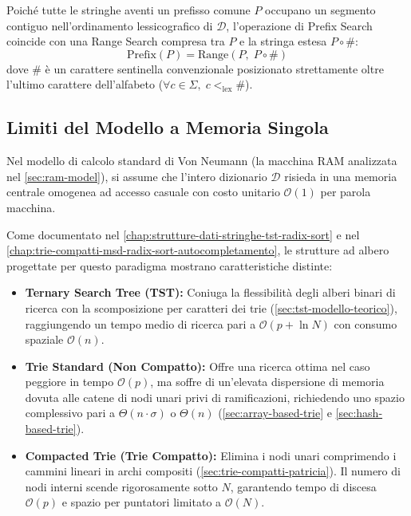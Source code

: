 \begin{property}
Poich\'e tutte le stringhe aventi un prefisso comune $P$ occupano un segmento contiguo nell'ordinamento lessicografico di $\mathcal{D}$, l'operazione di Prefix Search coincide con una Range Search compresa tra $P$ e la stringa estesa $P \circ \#$:
\begin{equation}
  \text{Prefix}(P) = \text{Range}(P, \; P \circ \#)
\end{equation}
dove $\#$ \`e un carattere sentinella convenzionale posizionato strettamente oltre l'ultimo carattere dell'alfabeto ($\forall c \in \Sigma, \; c <_{\text{lex}} \#$).
\end{property}

\FloatBarrier
\subsection{Limiti del Modello a Memoria Singola}
\label{subsec:limiti-1-memory-model}

Nel modello di calcolo standard di Von Neumann (la macchina RAM analizzata nel \autoref{sec:ram-model}), si assume che l'intero dizionario $\mathcal{D}$ risieda in una memoria centrale omogenea ad accesso casuale con costo unitario $\mathcal{O}(1)$ per parola macchina.

Come documentato nel \autoref{chap:strutture-dati-stringhe-tst-radix-sort} e nel \autoref{chap:trie-compatti-msd-radix-sort-autocompletamento}, le strutture ad albero progettate per questo paradigma mostrano caratteristiche distinte:
\begin{itemize}
  \item \textbf{Ternary Search Tree (TST):} Coniuga la flessibilit\`a degli alberi binari di ricerca con la scomposizione per caratteri dei trie (\autoref{sec:tst-modello-teorico}), raggiungendo un tempo medio di ricerca pari a $\mathcal{O}(p + \ln N)$ con consumo spaziale $\mathcal{O}(n)$.
  \item \textbf{Trie Standard (Non Compatto):} Offre una ricerca ottima nel caso peggiore in tempo $\mathcal{O}(p)$, ma soffre di un'elevata dispersione di memoria dovuta alle catene di nodi unari privi di ramificazioni, richiedendo uno spazio complessivo pari a $\Theta(n \cdot \sigma)$ o $\Theta(n)$ (\autoref{sec:array-based-trie} e \autoref{sec:hash-based-trie}).
  \item \textbf{Compacted Trie (Trie Compatto):} Elimina i nodi unari comprimendo i cammini lineari in archi compositi (\autoref{sec:trie-compatti-patricia}). Il numero di nodi interni scende rigorosamente sotto $N$, garantendo tempo di discesa $\mathcal{O}(p)$ e spazio per puntatori limitato a $\mathcal{O}(N)$.
\end{itemize}

